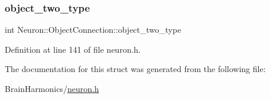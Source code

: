 \subsubsection{\texorpdfstring{object\+\_\+two\+\_\+type}{object\_two\_type}}
{\footnotesize\ttfamily int Neuron\+::\+Object\+Connection\+::object\+\_\+two\+\_\+type}



Definition at line 141 of file neuron.\+h.



The documentation for this struct was generated from the following file\+:\begin{DoxyCompactItemize}
\item 
Brain\+Harmonics/\hyperlink{neuron_8h}{neuron.\+h}\end{DoxyCompactItemize}
